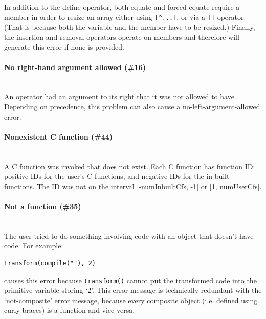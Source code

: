 \documentclass{article}
\newenvironment{code}{
       \begin{list}{}{
               \setlength{\leftmargin}{.4in}
               \setlength{\rightmargin}{0in}
               \setlength{\topsep}{.2in}
       }
       \small
       \item[] }
       { \end{list}   }
\begin{document}
In addition to the define operator, both equate and forced-equate require a member in order to resize an array either using \verb#[^...]#, or via a \verb#[]# operator.  (That is because both the variable and the member have to be resized.)  Finally, the insertion and removal operators operate on members and therefore will generate this error if none is provided.\\




\paragraph{No right-hand argument allowed (\#16)\\\\}

An operator had an argument to its right that it was not allowed to have.  Depending on precedence, this problem can also cause a no-left-argument-allowed error.\\




\paragraph{Nonexistent C function (\#44)\\\\}

A C function was invoked that does not exist.  Each C function has function ID: positive IDs for the user's C functions, and negative IDs for the in-built functions.  The ID was not on the interval [-numInbuiltCfs, -1] or [1, numUserCfs].\\




\paragraph{Not a function (\#35)\\\\}

The user tried to do something involving code with an object that doesn't have code.  For example:

\begin{code} \begin{verbatim}
transform(compile(""), 2)
\end{verbatim} \end{code}

\noindent causes this error because \verb#transform()# cannot put the transformed code into the primitive variable storing `2'.  This error message is technically redundant with the `not-composite' error message, because every composite object (i.e. defined using curly braces) is a function and vice versa.\\
\end{document}
